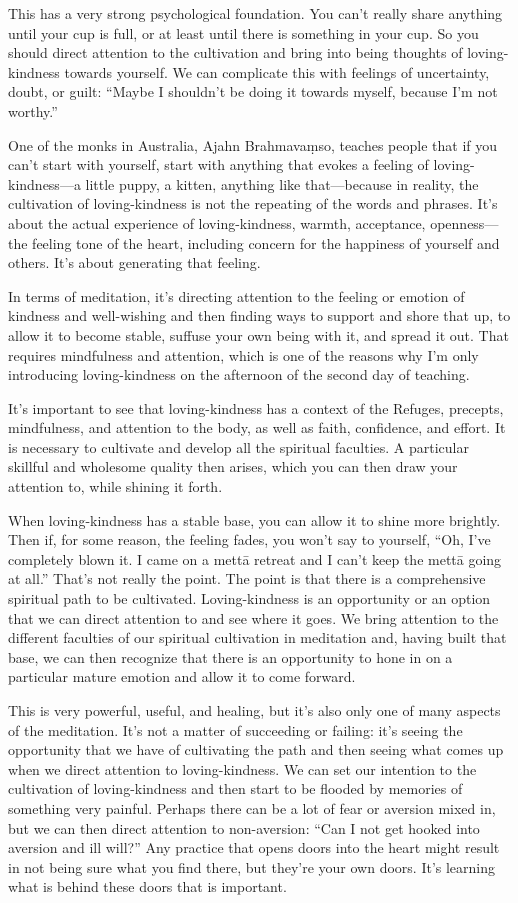 This has a very strong psychological foundation. You can’t really share
anything until your cup is full, or at least until there is something in
your cup. So you should direct attention to the cultivation and bring
into being thoughts of loving-kindness towards yourself. We can
complicate this with feelings of uncertainty, doubt, or guilt: “Maybe I
shouldn’t be doing it towards myself, because I’m not worthy.”

One of the monks in Australia, Ajahn Brahmavaṃso, teaches people that if
you can’t start with yourself, start with anything that evokes a feeling
of loving-kindness—a little puppy, a kitten, anything like that—because
in reality, the cultivation of loving-kindness is not the repeating of
the words and phrases. It’s about the actual experience of
loving-kindness, warmth, acceptance, openness—the feeling tone of the
heart, including concern for the happiness of yourself and others. It’s
about generating that feeling.

In terms of meditation, it’s directing attention to the feeling or
emotion of kindness and well-wishing and then finding ways to support
and shore that up, to allow it to become stable, suffuse your own being
with it, and spread it out. That requires mindfulness and attention,
which is one of the reasons why I’m only introducing loving-kindness on
the afternoon of the second day of teaching.

It’s important to see that loving-kindness has a context of the Refuges,
precepts, mindfulness, and attention to the body, as well as faith,
confidence, and effort. It is necessary to cultivate and develop all the
spiritual faculties. A particular skillful and wholesome quality then
arises, which you can then draw your attention to, while shining it
forth.

When loving-kindness has a stable base, you can allow it to shine more
brightly. Then if, for some reason, the feeling fades, you won’t say to
yourself, “Oh, I’ve completely blown it. I came on a mettā retreat and I
can’t keep the mettā going at all.” That’s not really the point. The
point is that there is a comprehensive spiritual path to be cultivated.
Loving-kindness is an opportunity or an option that we can direct
attention to and see where it goes. We bring attention to the different
faculties of our spiritual cultivation in meditation and, having built
that base, we can then recognize that there is an opportunity to hone in
on a particular mature emotion and allow it to come forward.

This is very powerful, useful, and healing, but it’s also only one of
many aspects of the meditation. It’s not a matter of succeeding or
failing: it’s seeing the opportunity that we have of cultivating the
path and then seeing what comes up when we direct attention to
loving-kindness. We can set our intention to the cultivation of
loving-kindness and then start to be flooded by memories of something
very painful. Perhaps there can be a lot of fear or aversion mixed in,
but we can then direct attention to non-aversion: “Can I not get hooked
into aversion and ill will?” Any practice that opens doors into the
heart might result in not being sure what you find there, but they’re
your own doors. It’s learning what is behind these doors that is
important.

